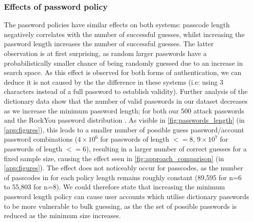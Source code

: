 \documentclass[british,11pt,a4paper]{article}
\begin{document}
\subsubsection{Effects of password policy}
The password policies have similar effects on both systems: passcode length negatively correlates with the number of successful guesses, whilst increasing the password length increases the number of successful guesses. The latter observation is at first surprising, as random larger passwords have a probabilistically smaller chance of being randomly guessed due to an increase in search space. As this effect is observed for both forms of authentication, we can deduce it is not caused by the the difference in these systems (i.e: using 3 characters instead of a full password to establish validity). Further analysis of the dictionary data show that the number of valid passwords in our dataset decreases as we increase the minimum password length; for both our 500 attack passwords and the RockYou password distribution \cite{Cubrilovic2009-wu}. As visible in \autoref{fig:passwords_length} (in \autoref{app:figures}), this leads to a smaller number of possible guess password/account password combinations ($4 \times 10^6 $ for  passwords  of length $<= 8$, $9 \times 10^7$ for passwords of length $<= 6$), resulting in a larger number of correct guesses for a fixed sample size, causing the effect seen in \autoref{fig:approach_comparison} (in \autoref{app:figures}). The effect does not noticeably occur for passcodes, as the number of passcodes in \cite{Cubrilovic2009-wu} for each policy length remains roughly constant (89,595 for n=6 to 55,803 for n=8). We could therefore state that increasing the minimum password length policy can cause user accounts which utilise dictionary passwords to be more vulnerable to bulk guessing, as the the set of possible passwords is reduced as the minimum size increases.





\end{document}
